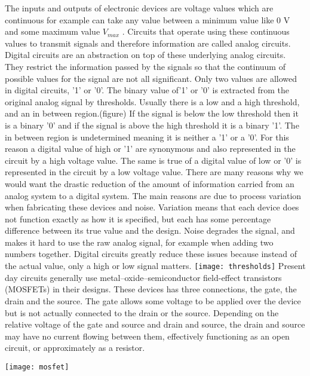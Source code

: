 \documentclass{article}
\begin{document}
The inputs and outputs of electronic devices are voltage values which are continuous for example can take any value between a minimum value like 0 V and some maximum value $V_{max}$ .  Circuits that operate using these continuous values to transmit signals and therefore information are called analog circuits.  Digital circuits are an abstraction on top of these underlying analog circuits.  They restrict the information passed by the signals so that the continuum of possible values for the signal are not all significant.  Only two values are allowed in digital circuits, '1' or '0'.  The binary value of'1' or '0' is extracted from the original analog signal by thresholds.  Usually there is a low and a high threshold, and an in between region.(figure)  If the signal is below the low threshold then it is a binary '0' and if the signal is above the high threshold it is a binary '1'.  The in between region is undetermined meaning it is neither a '1' or a '0'.  For this reason a digital value of high or '1' are synonymous and also represented in the circuit by a high voltage value.  The same is true of a digital value of low or '0' is represented in the circuit by a low voltage value.  There are many reasons why we would want the drastic reduction of the amount of information carried from an analog system to a digital system.  The main reasons are due to process variation when fabricating these devices and noise.  Variation means that each device does not function exactly as how it is specified, but each has some percentage difference between its true value and the design.  Noise degrades the signal, and makes it hard to use the raw analog signal, for example when adding two numbers together.  Digital circuits greatly reduce these issues because instead of the actual value, only a high or low signal matters.
\newline
\texttt{[image: thresholds]}
\newline
Present day circuits generally use metal–oxide–semiconductor field-effect transistors (MOSFETs) in their designs.  These devices has three connections, the gate, the drain and the source.  The gate allows some voltage to be applied over the device but is not actually connected to the drain or the source.  Depending on the relative voltage of the gate and source and drain and source, the drain and source may have no current flowing between them, effectively functioning as an open circuit, or approximately as a resistor.    
\newline
\begin{center}
\texttt{[image: mosfet]}
\end{center}
\end{document}
